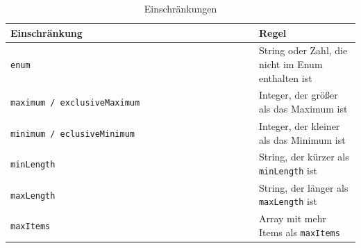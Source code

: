 \begin{table}[!t]
\centering
\caption{Einschränkungen}
\label{tab:constraints}
\begin{tabular}{|l|l|}
\hline
\textbf{Einschränkung} & \textbf{Regel}                                             \\ \hline
\lstinline|enum|                                                                                                                               & String oder Zahl, die nicht im Enum enthalten ist \\ \hline
\lstinline|maximum / exclusiveMaximum                                                                                                        | & Integer, der größer als das Maximum ist           \\ \hline
\lstinline|minimum / eclusiveMinimum                                                                                                         |                                                                                                                               & Integer, der kleiner als das Minimum ist          \\ \hline
\lstinline|minLength|                                                                                                                                                                                                                                                        & String, der kürzer als \lstinline|minLength|                                                                                                                                                                                                                                                         ist              \\ \hline
\lstinline|maxLength|                                                                                                                                                                                                                                                        & String, der länger als \lstinline|maxLength|                                                                                                                                                                                                                                                        ist              \\ \hline
\lstinline|maxItems|                                                                                                                                                                                                                                                         & Array mit mehr Items als \lstinline|maxItems|                                                                                                                                                                                                                                                                        \\ \hline

\end{tabular}
\end{table}
